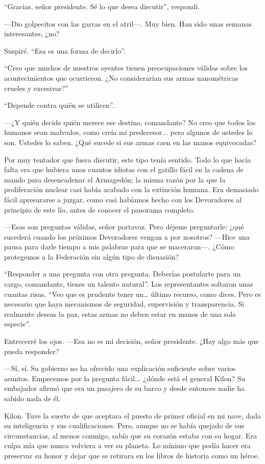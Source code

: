 ``Gracias, señor presidente. Sé lo que desea discutir'', respondí.

—Dio golpecitos con las garras en el atril—. Muy bien. Han sido unas semanas interesantes, ¿no?

Suspiré. ``Esa es una forma de decirlo''.

``Creo que muchos de nuestros oyentes tienen preocupaciones válidas sobre los acontecimientos que ocurrieron. ¿No considerarían sus armas nanométricas crueles y excesivas?''


``Depende contra quién se utilicen''.

—¿Y quién decide quién merece ese destino, comandante? No creo que todos los humanos sean malvados, como creía mi predecesor... pero algunos de ustedes lo son. Ustedes lo saben. ¿Qué sucede si sus armas caen en las manos equivocadas?

Por muy tentador que fuera discutir, este tipo tenía sentido. Todo lo que hacía falta era que hubiera unos cuantos idiotas con el gatillo fácil en la cadena de mando para desencadenar el Armagedón; la misma razón por la que la proliferación nuclear casi había acabado con la extinción humana. Era demasiado fácil apresurarse a juzgar, como casi habíamos hecho con los Devoradores al principio de este lío, antes de conocer el panorama completo.

—Esas son preguntas válidas, señor portavoz. Pero déjeme preguntarle: ¿qué sucederá cuando los próximos Devoradores vengan a por nosotros? —Hice una pausa para darle tiempo a mis palabras para que se maceraran—. ¿Cómo protegemos a la Federación sin algún tipo de disuasión?

``Responder a una pregunta con otra pregunta. Deberías postularte para un cargo, comandante, tienes un talento natural''. Los representantes soltaron unas cuantas risas. ``Veo que es prudente tener un… último recurso, como dices. Pero es necesario que haya mecanismos de seguridad, supervisión y transparencia. Si realmente deseas la paz, estas armas no deben estar en manos de una sola especie''.

Entrecerré los ojos. —Esa no es mi decisión, señor presidente. ¿Hay algo más que pueda responder?

—Sí, sí. Su gobierno no ha ofrecido una explicación suficiente sobre varios asuntos. Empecemos por la pregunta fácil... ¿dónde está el general Kilon? Su embajador afirmó que era un pasajero de su barco y desde entonces nadie ha sabido nada de él.

Kilon. Tuve la suerte de que aceptara el puesto de primer oficial en mi nave, dada su inteligencia y sus cualificaciones. Pero, aunque no se había quejado de sus circunstancias, al menos conmigo, sabía que su corazón estaba con su hogar. Era culpa mía que nunca volviera a ver su planeta. Lo mínimo que podía hacer era preservar su honor y dejar que se retirara en los libros de historia como un héroe.

